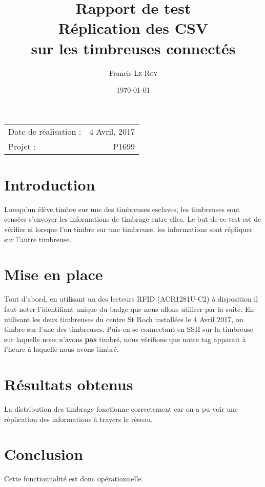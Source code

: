 \documentclass[10pt,a4paper,onecolumn]{article}
\title{Rapport de test \\ Réplication des CSV \\ sur les timbreuses connectés}
\author{Francis \textsc{Le Roy}}
\date{\today}
\begin{document}
\maketitle
\thispagestyle{fancy}

\begin{center}
\begin{tabular}{l r}
Date de réalisation : & 4 Avril, 2017 \\
Projet : & P1699 \\
\end{tabular}
\end{center}

\section{Introduction}
Lorsqu'un élève timbre sur une des timbreuses esclaves, les timbreuses sont censées s'envoyer les informations de timbrage entre elles. Le but de ce test est de vérifier si lorsque l'on timbre sur une timbreuse, les informations sont répliquer sur l'autre timbreuse.
\section{Mise en place}
Tout d'abord, en utilisant un des lecteurs RFID (ACR1281U-C2) à disposition il faut noter l'identifiant unique du badge que nous allons utiliser par la suite. En utilisant les deux timbreuses du centre St Roch installées le 4 Avril 2017, on timbre sur l'une des timbreuses. Puis en se connectant en SSH sur la timbreuse sur laquelle nous n'avons \textbf{pas} timbré, nous vérifions que notre tag apparait à l'heure à laquelle nous avons timbré.

\section{Résultats obtenus}
La distribution des timbrage fonctionne correctement car on a pu voir une réplication des informations à travers le réseau.
\section{Conclusion}
Cette fonctionnalité est donc opérationnelle.
\end{document}
